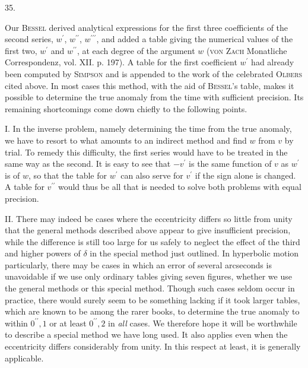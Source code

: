 \par{}
\begin{center}
\hypertarget{native-052-article035}{}35.
\end{center}
Our \textsc{Bessel} derived analytical expressions for the first three coefficients of the second series, $w^{\prime}$, $w^{\prime\prime}$, $w^{\prime\prime\prime}$, and added a table giving the numerical values of the first two, $w^{\prime}$ and $w^{\prime\prime}$, at each degree of the argument $w$ (\textsc{von Zach} Monatliche Correspondenz, vol. XII. p. 197). A table for the first coefficient $w^{\prime}$ had already been computed by \textsc{Simpson} and is appended to the work of the celebrated \textsc{Olbers} cited above. In most cases this method, with the aid of \textsc{Bessel}'s table, makes it possible to determine the true anomaly from the time with sufficient precision. Its remaining shortcomings come down chiefly to the following points.

I. In the inverse problem, namely determining the time from the true anomaly, we have to resort to what amounts to an indirect method and find $w$ from $v$ by trial. To remedy this difficulty, the first series would have to be treated in the same way as the second. It is easy to see that $-v^{\prime}$ is the same function of $v$ as $w^{\prime}$ is of $w$, so that the table for $w^{\prime}$ can also serve for $v^{\prime}$ if the sign alone is changed. A table for $v^{\prime\prime}$ would thus be all that is needed to solve both problems with equal precision.

II. There may indeed be cases where the eccentricity differs so little from unity that the general methods described above appear to give insufficient precision, while the difference is still too large for us safely to neglect the effect of the third and higher powers of $\delta$ in the special method just outlined. In hyperbolic motion particularly, there may be cases in which an error of several arcseconds is unavoidable if we use only ordinary tables giving seven figures, whether we use the general methods or this special method. Though such cases seldom occur in practice, there would surely seem to be something lacking if it took larger tables, which are known to be among the rarer books, to determine the true anomaly to within $0^{\prime\prime}{,}1$ or at least $0^{\prime\prime}{,}2$ in \emph{all} cases. We therefore hope it will be worthwhile to describe a special method we have long used. It also applies even when the eccentricity differs considerably from unity. In this respect at least, it is generally applicable.

